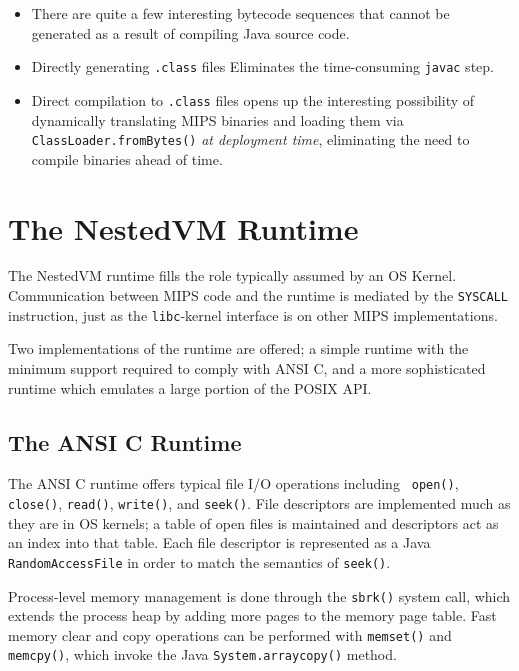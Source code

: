 \documentclass{acmconf}
\begin{document}
\begin{itemize}
      
\item There are quite a few interesting bytecode sequences that cannot
      be generated as a result of compiling Java source code.

\item Directly generating {\tt .class} files Eliminates the
      time-consuming {\tt javac} step.

\item Direct compilation to {\tt .class} files opens up the
      interesting possibility of dynamically translating MIPS binaries
      and loading them via {\tt ClassLoader.fromBytes()} {\it at
      deployment time}, eliminating the need to compile binaries ahead
      of time.

\end{itemize}


\section{The NestedVM Runtime}

The NestedVM runtime fills the role typically assumed by an OS Kernel.
Communication between MIPS code and the runtime is mediated by the
{\tt SYSCALL} instruction, just as the {\tt libc}-kernel interface is
on other MIPS implementations.

Two implementations of the runtime are offered; a simple runtime with
the minimum support required to comply with ANSI C, and a more
sophisticated runtime which emulates a large portion of the POSIX API.

\subsection{The ANSI C Runtime}

The ANSI C runtime offers typical file I/O operations including {\tt
open()}, {\tt close()}, {\tt read()}, {\tt write()}, and {\tt seek()}.
File descriptors are implemented much as they are in OS kernels; a
table of open files is maintained and descriptors act as an index into
that table.  Each file descriptor is represented as a Java {\tt
RandomAccessFile} in order to match the semantics of {\tt seek()}.

Process-level memory management is done through the {\tt sbrk()}
system call, which extends the process heap by adding more pages to
the memory page table.  Fast memory clear and copy operations can be
performed with {\tt memset()} and {\tt memcpy()}, which invoke the
Java {\tt System.arraycopy()} method.
\end{document}
